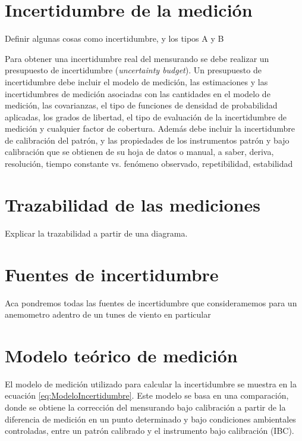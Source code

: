 \section{Incertidumbre de la medición}\label{sec:tipos_incertidumbre}

Definir algunas cosas como incertidumbre, y los tipos A y B

Para obtener una incertidumbre real del mensurando se debe realizar un presupuesto de incertidumbre (\textit{uncertainty budget}). Un presupuesto de incertidumbre debe incluir el modelo de medición, las estimaciones y las incertidumbres de medición asociadas con las cantidades en el modelo de medición, las covarianzas, el tipo de funciones de densidad de probabilidad aplicadas, los grados de libertad, el tipo de evaluación de la incertidumbre de medición y cualquier factor de cobertura. Además debe incluir la incertidumbre de calibración del patrón, y las propiedades de los instrumentos patrón y bajo calibración que se obtienen de su hoja de datos o manual, a saber, deriva, resolución, tiempo constante vs. fenómeno observado, repetibilidad, estabilidad

\section{Trazabilidad de las mediciones}\label{sec:trazabilidad}
Explicar la trazabilidad a partir de una diagrama.

\section{Fuentes de incertidumbre}\label{sec:fuentesDeIncertidumbre}


Aca pondremos todas las fuentes de incertidumbre que consideramemos para un anemometro adentro de un tunes de viento en particular

\section{Modelo teórico de medición}\label{sec:modelo_teoricos}

El modelo de medición utilizado para calcular la incertidumbre se muestra en la ecuación \ref{eq:ModeloIncertidumbre}. Este modelo se basa en una comparación, donde se obtiene la corrección del mensurando bajo calibración a partir de la diferencia de medición en un punto determinado y bajo condiciones ambientales controladas, entre un patrón calibrado y el instrumento bajo calibración (IBC).

